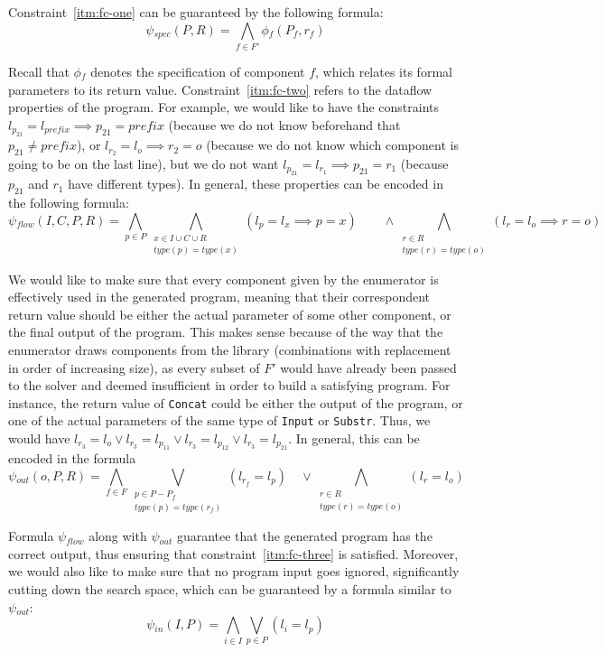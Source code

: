 Constraint~\ref{itm:fc-one} can be guaranteed by the following formula:
%
\[
  \psi{}_{spec}(P, R) = \bigwedge_{f \in F'} \phi{}_f (P_f, r_f)
\]

\noindent
Recall that $\phi{}_f$ denotes the specification of component $f$, which relates
its formal parameters to its return value.
Constraint~\ref{itm:fc-two} refers to
the dataflow properties of the program. For example, we would like to have the
constraints $l_{p_{21}} = l_{prefix} \implies p_{21} = prefix$ (because we do
not know beforehand that
$p_{21} \neq prefix$), or $l_{r_2} = l_o \implies r_2 = o$
(because we do not know which component is going to be on the last line), but we
do not want $l_{p_{21}} = l_{r_1} \implies p_{21} = r_1$ (because $p_{21}$ and
$r_1$ have different types). In general, these properties can be encoded in the
following formula:
%
\[
  \psi{}_{flow}(I, C, P, R) =
    \bigwedge_{p \in P}
    \bigwedge_{\substack{x \in I \cup C \cup R \\ type(p) = type(x)}} 
    (l_p = l_x \implies p = x)
    \qquad \wedge \bigwedge_{\substack{r \in R \\ type(r) = type(o)}}
    (l_r = l_o \implies r = o)
\]

\noindent
We would like to make sure that every component given by the enumerator is
effectively used in the generated program, meaning that their correspondent
return value should be either the actual parameter of some other component, or
the final output of the program. This makes sense because of the way that the
enumerator draws components from the library (combinations with replacement in
order of increasing size), as every subset of $F'$ would have already been
passed to the solver and deemed insufficient in order to build a satisfying
program. For instance, the return value of \lstinline{Concat} could be either
the output of the program, or one of the actual parameters of the same type of
\lstinline{Input} or \lstinline{Substr}. Thus, we would have
$l_{r_3} = l_o \vee l_{r_3} = l_{p_{11}} \vee l_{r_3} = l_{p_{12}} \vee l_{r_3} = l_{p_{21}}$.
In general, this can be encoded in the formula
%
\[
  \psi{}_{out}(o, P, R) =
  \bigwedge_{f \in F}
  \bigvee_{\substack{p \in P - P_f \\ type(p) = type(r_f)}}(l_{r_f} = l_p)
  \quad \vee \bigwedge_{\substack{r \in R \\ type(r) = type(o)}} (l_{r} = l_o)
\]

\noindent
Formula $\psi{}_{flow}$ along with $\psi{}_{out}$ guarantee that the generated
program has the correct output, thus ensuring that constraint~\ref{itm:fc-three}
is satisfied. Moreover, we would also like to make sure that no program input
goes ignored, significantly cutting down the search space, which can be
guaranteed by a formula similar to $\psi{}_{out}$:
%
\[
  \psi{}_{in}(I, P) = \bigwedge_{i \in I}\bigvee_{p \in P}(l_i = l_p)
\]

